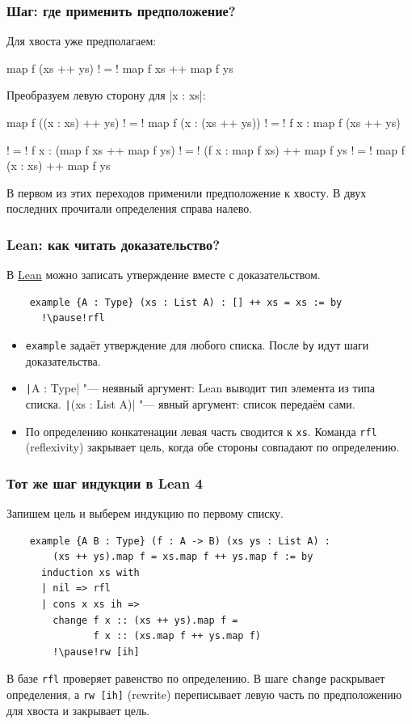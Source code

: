 \documentclass[11pt]{beamer}
\begin{document}
\begin{frame}[fragile]
  \frametitle{Шаг: где применить предположение?}
  Для хвоста уже предполагаем:
  \begin{haskellsmall}
    map f (xs ++ ys) !$=$! map f xs ++ map f ys
  \end{haskellsmall}
  Преобразуем левую сторону для \haskinline|x : xs|:
  \begin{haskellsmall}
      map f ((x : xs) ++ ys)
    !$=$! map f (x : (xs ++ ys))
    !$=$! f x : map f (xs ++ ys)
  \end{haskellsmall}
  \pause
  \begin{haskellsmall}
    !$=$! f x : (map f xs ++ map f ys)
    !$=$! (f x : map f xs) ++ map f ys
    !$=$! map f (x : xs) ++ map f ys
  \end{haskellsmall}
  В первом из этих переходов применили предположение к хвосту. В двух последних прочитали определения справа налево.
\end{frame}

\begin{frame}[fragile]
  \frametitle{Lean: как читать доказательство?}
  В \href{https://lean-lang.org/}{Lean} можно записать утверждение вместе с доказательством.
  \begin{verbatim}
    example {A : Type} (xs : List A) : [] ++ xs = xs := by
      !\pause!rfl
  \end{verbatim}
  \begin{itemize}
    \item \texttt{example} задаёт утверждение для любого списка. После \texttt{by} идут шаги доказательства.
    \item \texttt|{A : Type}| "--- неявный аргумент: Lean выводит тип элемента из типа списка. \texttt|(xs : List A)| "--- явный аргумент: список передаём сами.
    \item По определению конкатенации левая часть сводится к \texttt{xs}. Команда \texttt{rfl} (reflexivity) закрывает цель, когда обе стороны совпадают по определению.
  \end{itemize}
\end{frame}

\begin{frame}[fragile]
  \frametitle{Тот же шаг индукции в Lean 4}
  Запишем цель и выберем индукцию по первому списку.
  \begin{verbatim}
    example {A B : Type} (f : A -> B) (xs ys : List A) :
        (xs ++ ys).map f = xs.map f ++ ys.map f := by
      induction xs with
      | nil => rfl
      | cons x xs ih =>
        change f x :: (xs ++ ys).map f =
               f x :: (xs.map f ++ ys.map f)
        !\pause!rw [ih]
  \end{verbatim}
  В базе \texttt{rfl} проверяет равенство по определению.
  В шаге \texttt{change} раскрывает определения, а \texttt{rw [ih]} (rewrite) переписывает левую часть по предположению для хвоста и закрывает цель.
\end{frame}
\end{document}

